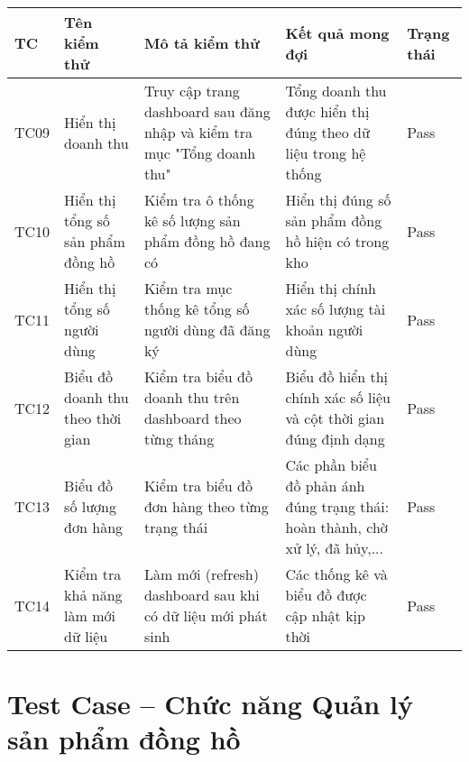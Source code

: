 \begin{longtable}{|p{1cm}|p{3cm}|p{4cm}|p{3cm}|p{2cm}|}
\hline
\textbf{TC} & \textbf{Tên kiểm thử} & \textbf{Mô tả kiểm thử} & \textbf{Kết quả mong đợi} & \textbf{Trạng thái} \\
\hline
TC09 & Hiển thị doanh thu & Truy cập trang dashboard sau đăng nhập và kiểm tra mục "Tổng doanh thu" & Tổng doanh thu được hiển thị đúng theo dữ liệu trong hệ thống & Pass \\
\hline
TC10 & Hiển thị tổng số sản phẩm đồng hồ & Kiểm tra ô thống kê số lượng sản phẩm đồng hồ đang có & Hiển thị đúng số sản phẩm đồng hồ hiện có trong kho & Pass \\
\hline
TC11 & Hiển thị tổng số người dùng & Kiểm tra mục thống kê tổng số người dùng đã đăng ký & Hiển thị chính xác số lượng tài khoản người dùng & Pass \\
\hline
TC12 & Biểu đồ doanh thu theo thời gian & Kiểm tra biểu đồ doanh thu trên dashboard theo từng tháng & Biểu đồ hiển thị chính xác số liệu và cột thời gian đúng định dạng & Pass \\
\hline
TC13 & Biểu đồ số lượng đơn hàng & Kiểm tra biểu đồ đơn hàng theo từng trạng thái & Các phần biểu đồ phản ánh đúng trạng thái: hoàn thành, chờ xử lý, đã hủy,... & Pass \\
\hline
TC14 & Kiểm tra khả năng làm mới dữ liệu & Làm mới (refresh) dashboard sau khi có dữ liệu mới phát sinh & Các thống kê và biểu đồ được cập nhật kịp thời & Pass \\
\hline
\end{longtable}

\section*{Test Case – Chức năng Quản lý sản phẩm đồng hồ}

